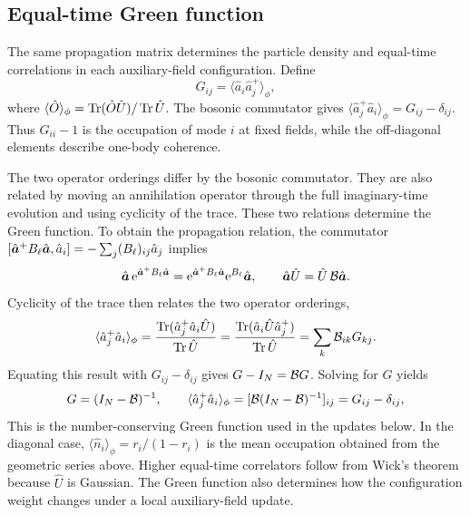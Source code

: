 \subsection{Equal-time Green function}
\label{app:green_number}

The same propagation matrix determines the particle density and equal-time correlations in each auxiliary-field configuration. Define
\begin{equation}
    G_{ij}=\langle\hat a_i\hat a_j^+\rangle_\phi,
\end{equation}
where $\langle\hat O\rangle_\phi=\operatorname{Tr}(\hat O\hat U)/\operatorname{Tr}\hat U$. The bosonic commutator gives $\langle\hat a_j^+\hat a_i\rangle_\phi=G_{ij}-\delta_{ij}$. Thus $G_{ii}-1$ is the occupation of mode $i$ at fixed fields, while the off-diagonal elements describe one-body coherence.

The two operator orderings differ by the bosonic commutator. They are also related by moving an annihilation operator through the full imaginary-time evolution and using cyclicity of the trace. These two relations determine the Green function. To obtain the propagation relation, the commutator $[\hat{\bm{a}}^+B_\ell\hat{\bm{a}},\hat a_i]=-\sum_j(B_\ell)_{ij}\hat a_j$ implies
\begin{equation}
    \hat{\bm{a}}\,\mathrm{e}^{\hat{\bm{a}}^+B_\ell\hat{\bm{a}}}
    =\mathrm{e}^{\hat{\bm{a}}^+B_\ell\hat{\bm{a}}}\mathrm{e}^{B_\ell}\hat{\bm{a}},
    \qquad
    \hat{\bm{a}}\hat U=\hat U\,\mathcal{B}\hat{\bm{a}}.
\end{equation}
Cyclicity of the trace then relates the two operator orderings,
\begin{equation}
    \langle\hat a_j^+\hat a_i\rangle_\phi
    =\frac{\operatorname{Tr}(\hat a_j^+\hat a_i\hat U)}{\operatorname{Tr}\hat U}
    =\frac{\operatorname{Tr}(\hat a_i\hat U\hat a_j^+)}{\operatorname{Tr}\hat U}
    =\sum_k\mathcal{B}_{ik}G_{kj}.
\end{equation}
Equating this result with $G_{ij}-\delta_{ij}$ gives $G-I_N=\mathcal{B} G$. Solving for $G$ yields
\begin{equation}
    G=(I_N-\mathcal{B})^{-1},
    \qquad
    \langle\hat a_j^+\hat a_i\rangle_\phi=[\mathcal{B}(I_N-\mathcal{B})^{-1}]_{ij}=G_{ij}-\delta_{ij},
\end{equation}
This is the number-conserving Green function used in the updates below. In the diagonal case, $\langle\hat n_i\rangle_\phi=r_i/(1-r_i)$ is the mean occupation obtained from the geometric series above. Higher equal-time correlators follow from Wick's theorem because $\hat U$ is Gaussian. The Green function also determines how the configuration weight changes under a local auxiliary-field update.


